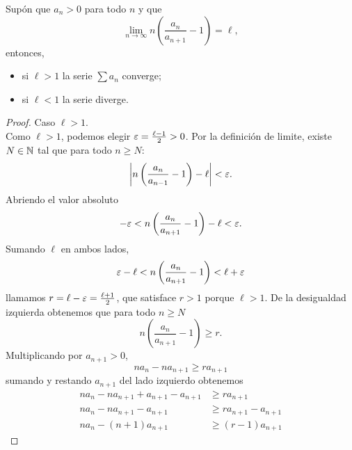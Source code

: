 \documentclass[12pt,a4paper]{article}
\newcommand{\paren}[1]{\left( #1 \right)}
\begin{document}
    \begin{ejercicio}
        Supón que $a_{n}\gt0$ para todo $n$ y que
        \begin{equation*}
            \lim_{n\to\infty}n\paren{\frac{a_{n}}{a_{n+1}}-1}=\ell,
        \end{equation*}
        entonces,
        \begin{itemize}
            \item si $\ell\gt1$ la serie $\sum a_{n}$ converge;
            \item si $\ell\lt1$ la serie diverge.
        \end{itemize}
    \end{ejercicio}

    \begin{proof}
        Caso $\ell\gt1$.\\
        Como $\ell\gt1$, podemos elegir $\varepsilon=\frac{\ell-1}{2}>0$. Por la
        definición de limite, existe $N\in\mathbb{N}$ tal que para todo $n\geq N$:
        \begin{equation*}
            \abs{n\paren{\frac{a_{n}}{a_{n-1}}-1}-\ell}\lt\e.
        \end{equation*}
        Abriendo el valor absoluto
        \begin{equation*}
            -\e\lt n\paren{\frac{a_{n}}{a_{n+1}}-1}-\ell\lt\e.
        \end{equation*}
        Sumando $\ell$ en ambos lados,
        \begin{equation*}
            \e-\ell\lt n\paren{\frac{a_{n}}{a_{n+1}}-1}\lt\ell+\e
        \end{equation*}
        llamamos $r=\ell-\varepsilon=\frac{\ell+1}{2}$, que satisface $r\gt1$ porque
        $\ell\gt1$. De la desigualdad izquierda obtenemos que para todo
        $n\geq N$
        \begin{equation*}
            n\paren{\frac{a_{n}}{a_{n+1}}-1}\geq r.
        \end{equation*}
        Multiplicando por $a_{n+1}\gt0$,
        \begin{equation*}
            na_{n}-na_{n+1}\geq ra_{n+1}
        \end{equation*}
        sumando y restando $a_{n+1}$ del lado izquierdo obtenemos
        \begin{align*}
            na_{n}-na_{n+1}+a_{n+1}-a_{n+1}&\geq ra_{n+1}\\
            na_{n}-na_{n+1}-a_{n+1}&\geq ra_{n+1}-a_{n+1}\\
            na_{n}-(n+1)a_{n+1}&\geq(r-1)a_{n+1}

\end{align*}
\end{proof}
\end{document}
